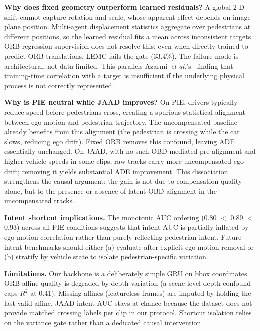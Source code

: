 \documentclass[conference]{IEEEtran}
\begin{document}
\textbf{Why does fixed geometry outperform learned residuals?}
A global 2-D shift cannot capture rotation and scale, whose apparent effect depends on image-plane position.
Multi-agent displacement statistics aggregate over pedestrians at different positions, so the learned residual fits a mean across inconsistent targets.
ORB-regression supervision does not resolve this: even when directly trained to predict ORB translations, LEMC fails the gate (33.4\%).
The failure mode is architectural, not data-limited.
This parallels Azarmi~\textit{et al.}'s~\cite{azarmi2024feature} finding that training-time correlation with a target is insufficient if the underlying physical process is not correctly represented.

\textbf{Why is PIE neutral while JAAD improves?}
On PIE, drivers typically reduce speed before pedestrians cross, creating a spurious statistical alignment between ego motion and pedestrian trajectory.
The uncompensated baseline already benefits from this alignment (the pedestrian is crossing while the car slows, reducing ego drift).
Fixed ORB removes this confound, leaving ADE essentially unchanged.
On JAAD, with no such OBD-mediated pre-alignment and higher vehicle speeds in some clips, raw tracks carry more uncompensated ego drift; removing it yields substantial ADE improvement.
This dissociation strengthens the causal argument: the gain is not due to compensation quality alone, but to the presence or absence of latent OBD alignment in the uncompensated tracks.

\textbf{Intent shortcut implications.}
The monotonic AUC ordering (0.80 $<$ 0.89 $<$ 0.93) across all PIE conditions suggests that intent AUC is partially inflated by ego-motion correlation rather than purely reflecting pedestrian intent.
Future intent benchmarks should either (a) evaluate after explicit ego-motion removal or (b) stratify by vehicle state to isolate pedestrian-specific variation.

\textbf{Limitations.}
Our backbone is a deliberately simple GRU on bbox coordinates.
ORB affine quality is degraded by depth variation (a scene-level depth confound caps $R^2$ at 0.41).
Missing affines (featureless frames) are imputed by holding the last valid affine.
JAAD intent AUC stays at chance because the dataset does not provide matched crossing labels per clip in our protocol.
Shortcut isolation relies on the variance gate rather than a dedicated causal intervention.

\end{document}
